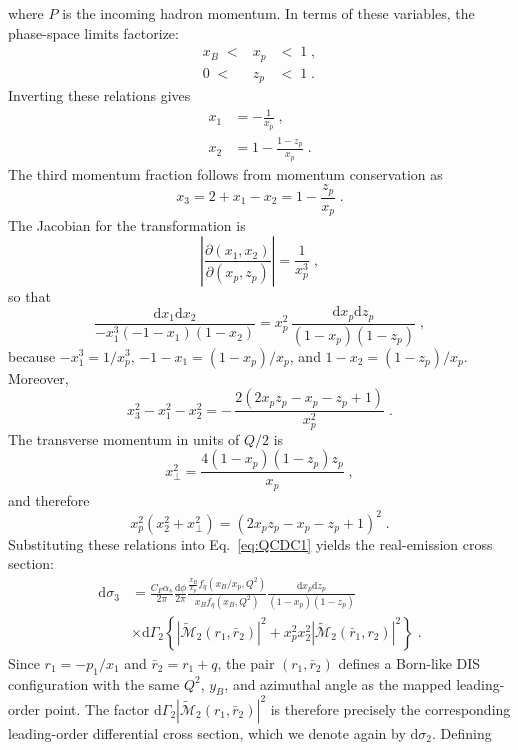 \documentclass[a4paper,11pt]{article}
\begin{document}
where $P$ is the incoming hadron momentum. In terms of these variables, the phase-space limits factorize:
\begin{eqnarray}
  x_B \;<& x_p &<\; 1\;, \\
        0 \;<& z_p &<\; 1\;.
\end{eqnarray}
Inverting these relations gives
\begin{align}
  x_1 &= -\frac{1}{x_p}\;, \\
  x_2 &= 1-\frac{1-z_p}{x_p}\;.
\end{align}
The third momentum fraction follows from momentum conservation as
\begin{equation}
  x_3 = 2+x_1-x_2 = 1-\frac{z_p}{x_p}\;.
\end{equation}
The Jacobian for the transformation is
\begin{equation}
  \left|\frac{\partial(x_1,x_2)}{\partial(x_p,z_p)}\right| = \frac{1}{x_p^3}\;,
\end{equation}
so that
\begin{equation}
  \frac{\mathrm{d} x_1 \mathrm{d}x_2}{-x_1^3(-1-x_1)(1-x_2)}
  = x_p^2\,\frac{\mathrm{d} x_p \mathrm{d}z_p}{(1-x_p)(1-z_p)}\;,
\end{equation}
because $-x_1^3=1/x_p^3$, $-1-x_1=(1-x_p)/x_p$, and $1-x_2=(1-z_p)/x_p$. Moreover,
\begin{equation}
  x_3^2-x_1^2-x_2^2 = -\,\frac{2(2x_pz_p-x_p-z_p+1)}{x_p^2}\;.
\end{equation}
The transverse momentum in units of $Q/2$ is
\begin{equation}
  x_\perp^2 = \frac{4(1-x_p)(1-z_p)z_p}{x_p}\;,
\end{equation}
and therefore
\begin{equation}
  x_p^2(x_2^2+x_\perp^2) = (2x_pz_p-x_p-z_p+1)^2\;.
\end{equation}
Substituting these relations into Eq.~\eqref{eq:QCDC1} yields the real-emission cross section:
\begin{align}
  \mathrm{d}\sigma_3 &= \frac{C_F\alpha_s}{2\pi}\frac{\mathrm{d}\phi}{2\pi}
    \frac{\frac{x_B}{x_p} f_q(x_B/x_p,Q^2)}
         { x_B    f_q( x_B    ,Q^2)}
    \frac{\mathrm{d} x_p \mathrm{d}z_p}{(1-x_p)(1-z_p)}\;
\nonumber\\&
   \times \mathrm{d} \Gamma_2 \left\{ |\widetilde{\mathcal{M}}_2(r_1,\bar{r}_2)|^2 +
        x_p^2 x_2^2 |\widetilde{\mathcal{M}}_2(\bar{r}_1,r_2)|^2 \right\}\;.
\label{eq:QCDC2}
\end{align}
Since $r_1 = -p_1/x_1$ and $\bar{r}_2 = r_1 + q$, the pair $(r_1,\bar{r}_2)$ defines a Born-like DIS configuration with the same $Q^2$, $y_B$, and azimuthal angle as the mapped leading-order point. The factor $\mathrm{d} \Gamma_2 |\widetilde{\mathcal{M}}_2(r_1,\bar{r}_2)|^2$ is therefore precisely the corresponding leading-order differential cross section, which we denote again by $\mathrm{d}\sigma_2$. Defining
\end{document}
